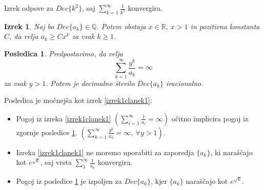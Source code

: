 \documentclass{beamer}
\def\Q{\mathbb{Q}} %
\def\R{\mathbb{R}} %
\newtheorem{izrek}{Izrek}
\newtheorem{posledica}{Posledica}
\begin{document}
\begin{frame}

    Izrek odpove za $Dec\{k^2\}$, saj $\sum_{k=1}^{\infty}\frac{1}{k^2}$ konvergira.
    \pause

    \begin{izrek}
        Naj bo $Dec\{a_k\} \in \Q$. Potem obstaja $x \in \R, \ x > 1$ in pozitivna konstanta $C$,
        da velja $a_k \geq Cx^k$ za vsak $k \geq 1$.
    \end{izrek}
    \pause


    \begin{posledica}\label{posledica}
        Predpostavimo, da velja
        \[
            \sum_{k=1}^{\infty}\frac{y^k}{a_k} = \infty\]
        za vsak $y > 1$. Potem je decimalno število $Dec\{a_k\}$ iracionalno.
    \end{posledica}

\end{frame}

\begin{frame}
    Posledica je močnejša kot izrek \ref{izrek1clanek1}:
    \begin{itemize}
        \item Pogoj iz izreka \ref{izrek1clanek1} 
        $(\sum_{i=1}^{\infty} \frac{1}{a_i} = \infty)$ očitno implicira
        pogoj iz zgornje posledice \ref{posledica}.
        \pause
        $(\sum_{k=1}^{\infty}\frac{y^k}{a_k} = \infty , \ \forall y > 1)$.
        \item Izreka \ref{izrek1clanek1} ne moremo uporabiti za zaporedja $\{a_k\}$, ki naraščajo kot $e^{\sqrt{k}}$,
                saj vrsta $\sum_1^{\infty}\frac{1}{a_k}$ konvergira.
            \pause
        \item Pogoj iz posledice \ref{posledica} je izpoljen za $Dec\{a_k\}$, kjer $\{a_k\}$ naraščajo kot $e^{\sqrt{k}}$.

    \end{itemize}
\end{frame}
\end{document}
